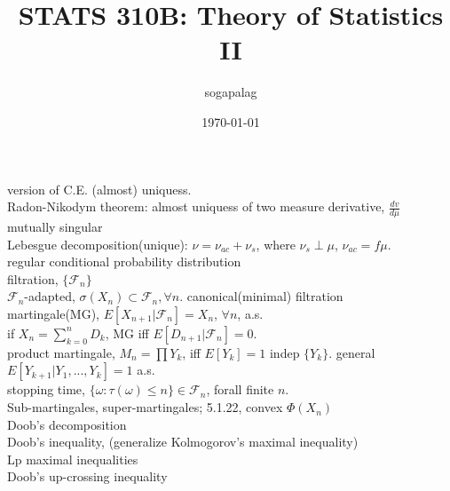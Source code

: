 \documentclass[paper=a4, fontsize=11pt]{scrartcl} %
\title{STATS 310B: Theory of Statistics II}
\author{sogapalag}
\date{\normalsize\today}
\numberwithin{equation}{section} %
\numberwithin{figure}{section} %
\numberwithin{table}{section} %
\begin{document}
\maketitle

version of C.E. (almost) uniquess.\\
Radon-Nikodym theorem: almost uniquess of two measure derivative, $\frac{dv}{d\mu}$\\
mutually singular\\
Lebesgue decomposition(unique): $\nu=\nu_{ac}+\nu_s$, where $\nu_s\perp \mu$, $\nu_{ac}=f\mu$.\\
regular conditional probability distribution\\
filtration, $\{\mathcal{F}_n\}$\\
$\mathcal{F}_n$-adapted, $\sigma(X_n)\subset \mathcal{F}_n,\forall n$.
canonical(minimal) filtration\\
martingale(MG), $E[X_{n+1}|\mathcal{F}_n]=X_n$, $\forall n$, a.s.\\
if $X_n=\sum_{k=0}^n D_k$, MG iff $E[D_{n+1}|\mathcal{F}_n]=0$.\\
product martingale, $M_n=\prod Y_k$, iff $E[Y_k]=1$ indep $\{Y_k\}$. general $E[Y_{k+1}|Y_1,...,Y_k]=1$ a.s.\\
stopping time, $\{\omega:\tau(\omega)\leq n\}\in \mathcal{F}_n$, forall finite $n$.\\
Sub-martingales, super-martingales; 5.1.22, convex $\Phi(X_{n})$\\
Doob's decomposition\\
Doob's inequality, (generalize Kolmogorov's maximal inequality)\\
Lp maximal inequalities\\
Doob's up-crossing inequality\\
\end{document}
